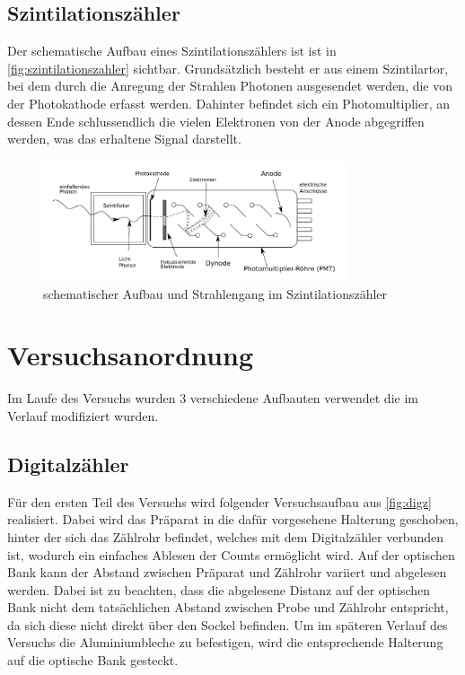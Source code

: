 \documentclass[12pt,english,ngerman]{scrartcl}
\begin{document}
\subsection{Szintilationszähler}

Der schematische Aufbau eines Szintilationszählers ist ist in \autoref{fig:szintilationszahler} sichtbar.
Grundsätzlich besteht er aus einem Szintilartor, bei dem durch die Anregung der Strahlen Photonen ausgesendet werden, 
die von der Photokathode erfasst werden. Dahinter befindet sich ein Photomultiplier, an dessen Ende schlussendlich
die vielen Elektronen von der Anode abgegriffen werden, was das erhaltene Signal darstellt.\cite[]{}

\begin{figure}[H]
  \begin{center}
  \includegraphics[width=0.8\textwidth]{./figures/szintilationszahler.png}
	\end{center}
	\caption{schematischer Aufbau und Strahlengang im Szintilationszähler \cite[]{}}
	\label{fig:szintilationszahler}
    
\end{figure}


\section{Versuchsanordnung}\label{sec:Versuchsanordnung}

Im Laufe des Versuchs wurden 3 verschiedene Aufbauten verwendet die im Verlauf modifiziert wurden.

\subsection{Digitalzähler}\label{aufbau_Digz}

Für den ersten Teil des Versuchs wird folgender Versuchsaufbau aus
\autoref{fig:digz} realisiert. Dabei wird das Präparat in die dafür vorgesehene
Halterung geschoben, hinter der sich das Zählrohr befindet, welches mit dem
Digitalzähler verbunden ist, wodurch ein einfaches Ablesen der Counts
ermöglicht wird. Auf der optischen Bank kann der Abstand zwischen Präparat und
Zählrohr variiert und abgelesen werden. Dabei ist zu beachten, dass die
abgelesene Distanz auf der optischen Bank nicht dem tatsächlichen Abstand
zwischen Probe und Zählrohr entspricht, da sich diese nicht direkt über den
Sockel befinden. Um im späteren Verlauf des Versuchs die Aluminiumbleche zu
befestigen, wird die entsprechende Halterung auf die optische Bank gesteckt.
\end{document}
